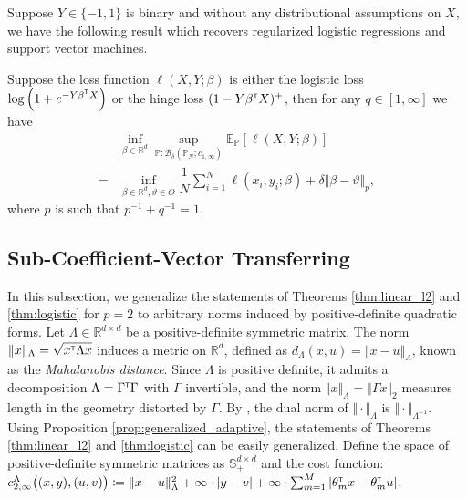 \documentclass[12pt]{article}
\begin{document}
Suppose $Y\in\{-1,1\}$ is binary and without any distributional assumptions on $X$, we have the following result which recovers regularized logistic regressions and support vector machines.
\begin{theorem}
\label{thm:logistic}
Suppose the loss function $\ell(X,Y;\beta)$ is either the logistic loss $\log{\left(1+e^{-Y\beta^{\scriptscriptstyle \sf T}X}\right)}$ or the hinge loss $(1-Y\beta^{\scriptscriptstyle \sf T} X)^+$, then for any $q\in[1,\infty]$  we have
\begin{align*}
    &\inf_{\beta\in\mathbb{R}^d} \sup_{\mathbb{P}:\mathcal{B}_\delta(\mathbb{P}_N;c_{1,\infty})} \mathbb{E}_{\mathbb{P}}\left[\ell(X,Y;\beta)\right]\\
   =& \inf_{\beta\in\mathbb{R}^d,\vartheta\in\Theta}\dfrac{1}{N}\sum_{i=1}^N \ell(x_i,y_i;\beta) + \delta \Vert \beta - \vartheta \Vert_p,
\end{align*}
where $p$ is such that $p^{-1}+q^{-1}=1$.
\end{theorem}


\subsection{Sub-Coefficient-Vector Transferring}
In this subsection, we generalize the statements of Theorems \ref{thm:linear_l2} and \ref{thm:logistic} for $p=2$ to arbitrary norms induced by positive-definite quadratic forms. Let $\Lambda \in \mathbb{R}^{d \times d}$ be a positive-definite symmetric matrix. The norm $\Vert x \Vert_\Lambda = \sqrt{x^{\scriptscriptstyle \sf T} \Lambda x}$ induces a metric on $\mathbb{R}^d$, defined as $d_{\Lambda}(x, u) = \Vert x - u \Vert_\Lambda$, known as the \textit{Mahalanobis distance}. Since $\Lambda$ is positive definite, it admits a decomposition $\Lambda = \Gamma^{\scriptscriptstyle \sf T} \Gamma$ with $\Gamma$ invertible, and the norm $\Vert x \Vert_\Lambda = \Vert \Gamma x \Vert_2$ measures length in the geometry distorted by $\Gamma$. By \citep[Lemma 1]{blanchet2019data-drivencost}, the dual norm of $\Vert \cdot \Vert_\Lambda$ is $\Vert \cdot \Vert_{\Lambda^{-1}}$. Using Proposition \ref{prop:generalized_adaptive}, the statements of Theorems \ref{thm:linear_l2} and \ref{thm:logistic} can be easily generalized. Define the space of positive-definite symmetric matrices as $\mathbb{S}_+^{d \times d}$ and the cost function: $c_{2,\infty}^\Lambda \big((x, y), (u, v)\big) \coloneqq \Vert x - u \Vert_\Lambda^2 + \infty \cdot |y - v| + \infty \cdot \sum_{m=1}^M |\theta_m^{\scriptscriptstyle \sf T} x - \theta_m^{\scriptscriptstyle \sf T} u|$.
\end{document}
